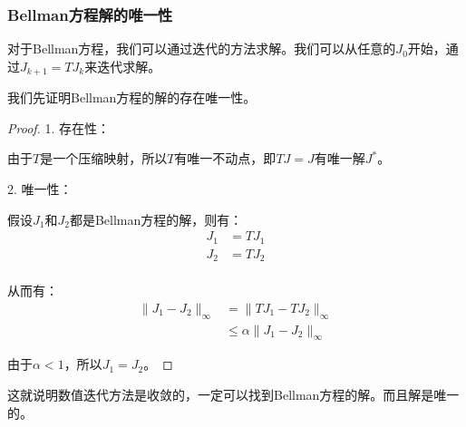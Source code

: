 \subsubsection{Bellman方程解的唯一性}

对于Bellman方程，我们可以通过迭代的方法求解。我们可以从任意的$J_0$开始，通过$J_{k+1}=TJ_k$来迭代求解。

我们先证明Bellman方程的解的存在唯一性。

\begin{proof}
    1. 存在性：

    由于$T$是一个压缩映射，所以$T$有唯一不动点，即$TJ=J$有唯一解$J^*$。

    2. 唯一性：

    假设$J_1$和$J_2$都是Bellman方程的解，则有：
    \begin{equation}
        \begin{aligned}
            J_1 & = T J_1 \\
            J_2 & = T J_2 \\
        \end{aligned}
    \end{equation}

    从而有：
    \begin{equation}
        \begin{aligned}
            \|J_1-J_2\|_{\infty} & = \|TJ_1-TJ_2\|_{\infty}         \\
                                 & \leq \alpha \|J_1-J_2\|_{\infty}
        \end{aligned}
    \end{equation}

    由于$\alpha < 1$，所以$J_1=J_2$。
\end{proof}

这就说明数值迭代方法是收敛的，一定可以找到Bellman方程的解。而且解是唯一的。


